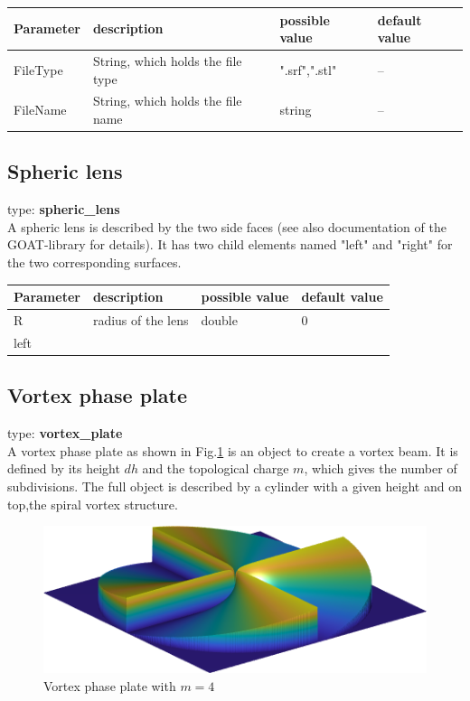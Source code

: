 \documentclass[a4paper,html,11pt,openany]{book}
\begin{document}
 
\vspace{1em} 
\begin{tabular}{p{2cm}|m{3.5cm}|m{3.0cm}|p{1.7cm}}
 Parameter  & description  & possible value & default value\\
 \hline
 FileType & String, which holds the file type & ".srf",".stl" & -- \\
 FileName & String, which holds the file name & string & -- \\
 \end{tabular}
 
\subsection{Spheric lens}
type: \textbf{spheric\_lens} \\
A spheric lens is described by the two side faces (see also documentation of the GOAT-library for details). It has two child elements named "left" and "right" for the two corresponding surfaces. 

 
\vspace{1em} 
\begin{tabular}{p{2cm}|m{3.5cm}|m{3.0cm}|p{1.7cm}}
 Parameter  & description  & possible value & default value\\
 \hline
 R & radius of the lens & double & 0 \\
 \hline
 left  
 \end{tabular}
 
\subsection{Vortex phase plate}
type: \textbf{vortex\_plate} \\
A vortex phase plate as shown in Fig.\ref{fig:vortexplate} is an object to create a vortex beam. It is defined by its height $dh$ and the topological charge $m$, which gives the number of subdivisions. The full object is described by a cylinder with a given height and on top,the spiral vortex structure.   
\begin{figure}[h!]
   \includegraphics{vortex_plate.png}
   \caption{Vortex phase plate with $m=4$}
   \label{fig:vortexplate}
\end{figure} 
\end{document}
